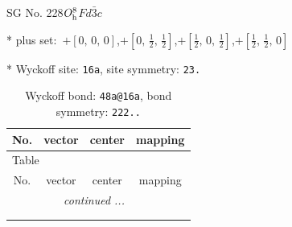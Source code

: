 \documentclass[fleqn,8pt]{jsarticle}
\begin{document}
\setcounter{MaxMatrixCols}{32}

\renewcommand{\tablename}{Table~}
\renewcommand{\figurename}{Figure~}
\begin{center}
\LARGE
SG No. 228\quad$O_{\rm h}^{8}$\quad$Fd\bar{3}c$\quad[ cubic ]
\end{center}

* plus set:\,\,\,$+\left[ 0,\, 0,\, 0 \right]$,\quad $+\left[ 0,\, \frac{1}{2},\, \frac{1}{2} \right]$,\quad $+\left[ \frac{1}{2},\, 0,\, \frac{1}{2} \right]$,\quad $+\left[ \frac{1}{2},\, \frac{1}{2},\, 0 \right]$


* Wyckoff site: {\tt 16a}, site symmetry: {\tt 23.}
\renewcommand{\arraystretch}{1.2}
\begin{longtable}{cccc}
\caption{Wyckoff bond: {\tt 48a@16a}, bond symmetry: {\tt 222..}}
 \\
 \hline \hline
No. & vector & center & mapping \\ \hline \endfirsthead

\multicolumn{3}{l}{\tablename\ \thetable{}} \\
 \hline \hline
No. & vector & center & mapping \\ \hline \endhead

 \hline \hline
\multicolumn{3}{r}{\footnotesize\it continued ...} \\ \endfoot

 \hline \hline
\multicolumn{3}{r}{} \\ \endlastfoot


\end{longtable}
\end{document}
